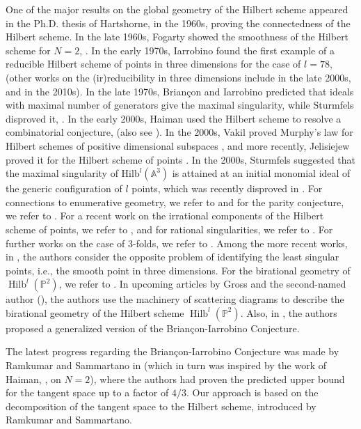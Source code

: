 \documentclass[11pt,a4paper,leqno,noamsfonts]{amsart}
\numberwithin{equation}{section}
\newcommand{\BA}{{\mathbb{A}}}
\newcommand{\BP}{{\mathbb{P}}}
\DeclareMathOperator{\Hilb}{Hilb}
\theoremstyle{definition}
\theoremstyle{thm}
\theoremstyle{ex}
\theoremstyle{sol}
\begin{document}
One of the major results on the global geometry of the Hilbert scheme appeared in the Ph.D. thesis of Hartshorne, \cite{HartshorneConnectedness} in the 1960s,  proving the connectedness of the Hilbert scheme. In the late 1960s, Fogarty showed the smoothness of the Hilbert scheme for $N=2$, \cite{Fogarty}. In the early 1970s, Iarrobino found the first example of a reducible Hilbert scheme of points in three dimensions for the case of $l=78$, \cite{Iarrobino72} (other works on the (ir)reducibility in three dimensions include \cite{Hilb8} in the late 2000s, and \cite{Jardim, Hilb_11} in the 2010s). In the late 1970s, Brian\c{c}on and Iarrobino predicted that ideals with maximal number of generators give the maximal singularity, while Sturmfels disproved it, \cite{Sturmfels}. In the early 2000s, Haiman used the Hilbert scheme to resolve a combinatorial conjecture, \cite{Haiman2} (also see \cite{MillerSturmfels2005}). In the 2000s, Vakil proved Murphy's law for Hilbert schemes of positive dimensional subspaces \cite{Vakil06},  and more recently, Jelisiejew proved it for the Hilbert scheme of points \cite{Jelisiejew20}.  In the 2000s, Sturmfels suggested that the maximal singularity of $\mathrm{Hilb}^l(\BA^3)$ is attained at an initial
monomial ideal of the generic configuration of $l$ points, which was recently disproved in \cite{Ramkumar-Sammartano}. For connections to enumerative geometry, we refer to \cite{BBS, BFHilb,JKSCounterBehrend, MNOP1, Nesterov25, PT, RicolfiSign} and for the parity conjecture, we refer to \cite{PandharipandeSlides,Ramkumar-Sammartano1,GGGL23}. For a recent work on the irrational components of the Hilbert scheme of points, we refer to \cite{Farkas-Pandharipande-Sammartano24}, and for rational singularities, we refer to \cite{Ramkumar-Sammartano24}. For further works on the case of 3-folds, we refer to \cite{KatzS, HuX}. Among the more recent works, in \cite{Jelisiejew-Ramkumar-Sammartano24}, the authors consider the opposite problem of identifying the least singular points, i.e., the smooth point in three dimensions. For the birational geometry of $\Hilb^l(\BP^2)$, we refer to \cite{ABCH, Huizenga-2016, Huizenga-thesis, LZ, LZ2}. In upcoming articles by Gross and the second-named author (\cite{Gross-Rezaee1, Gross-Rezaee2}), the authors use the machinery of scattering diagrams to describe the birational geometry of the Hilbert scheme $\Hilb^l(\mathbb{P}^2)$. Also, in \cite{Conj-ARZ}, the authors proposed a generalized version of the Brian\c{c}on-Iarrobino Conjecture.

The latest progress regarding the Brian\c{c}on-Iarrobino Conjecture was made by Ramkumar and Sammartano in \cite{Ramkumar-Sammartano} (which in turn was inspired by the work of Haiman, \cite{HAIMAN1998201}, on $N=2$), where the authors had proven the predicted upper bound for the tangent space up to a factor of $4/3$. Our approach is based on the decomposition of the tangent space to the Hilbert scheme, introduced by Ramkumar and Sammartano.
\end{document}
